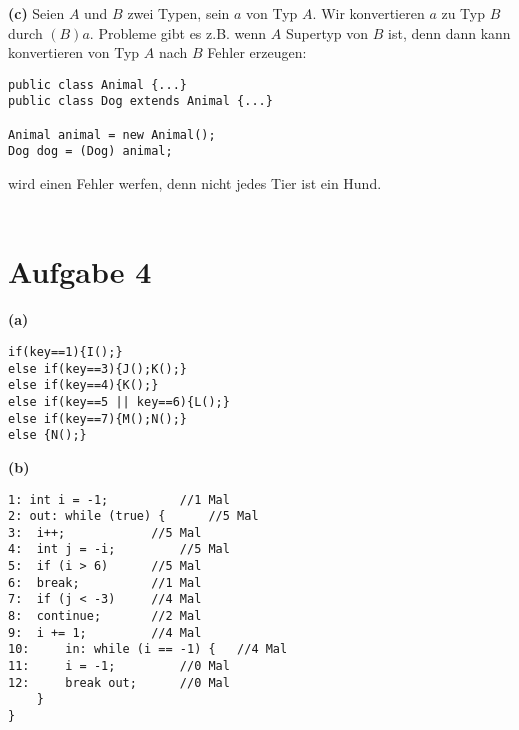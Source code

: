 \documentclass[]{article}
\begin{document}
\textbf{(c)}
Seien $A$ und $B$ zwei Typen, sein $a$ von Typ $A$. Wir konvertieren $a$ zu Typ $B$ durch $(B) a$.
Probleme gibt es z.B. wenn $A$ Supertyp von $B$ ist, denn dann kann konvertieren von Typ $A$ nach $B$ Fehler erzeugen: \begin{lstlisting}[frame=single]
public class Animal {...}
public class Dog extends Animal {...}

Animal animal = new Animal();
Dog dog = (Dog) animal;
\end{lstlisting}

wird einen Fehler werfen, denn nicht jedes Tier ist ein Hund.
\\\\
\maketitle \section*{Aufgabe 4}
\textbf{(a)}
\begin{lstlisting}[frame=single]
if(key==1){I();}
else if(key==3){J();K();}
else if(key==4){K();}
else if(key==5 || key==6){L();}
else if(key==7){M();N();}
else {N();}
\end{lstlisting}

\textbf{(b)}
\begin{lstlisting}[frame=single]
1: int i = -1;			//1 Mal
2: out: while (true) { 		//5 Mal
3: 	i++; 			//5 Mal
4: 	int j = -i; 		//5 Mal
5: 	if (i > 6)		//5 Mal
6:	break;			//1 Mal
7: 	if (j < -3)		//4 Mal
8: 	continue;		//2 Mal
9: 	i += 1;			//4 Mal
10: 	in: while (i == -1) {	//4 Mal
11: 	i = -1;			//0 Mal
12: 	break out;		//0 Mal
	}
}
\end{lstlisting}
\end{document}
